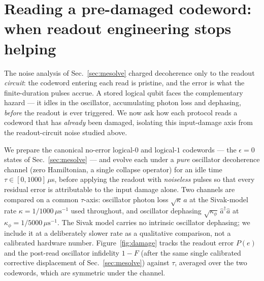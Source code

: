 
\section{Reading a pre-damaged codeword: when readout engineering stops helping}\label{sec:damage}

The noise analysis of Sec.~\ref{sec:mesolve} charged decoherence only to the readout
\emph{circuit}: the codeword entering each read is pristine, and the error is what the
finite-duration pulses accrue. A stored logical qubit faces the complementary hazard --- it
idles in the oscillator, accumulating photon loss and dephasing, \emph{before} the readout is
ever triggered. We now ask how each protocol reads a codeword that has \emph{already} been
damaged, isolating this input-damage axis from the readout-circuit noise studied above.

We prepare the canonical no-error logical-$0$ and logical-$1$ codewords --- the $\epsilon=0$
states of Sec.~\ref{sec:mesolve} --- and evolve each under a \emph{pure} oscillator
decoherence channel (zero Hamiltonian, a single collapse operator) for an idle time
$\tau\in[0,1000]\,\mu$s, before applying the readout with \emph{noiseless} pulses so that
every residual error is attributable to the input damage alone. Two channels are compared on a
common $\tau$-axis: oscillator photon loss $\sqrt{\kappa}\,\hat a$ at the Sivak-model rate
$\kappa=1/1000\,\mu\mathrm{s}^{-1}$ used throughout, and oscillator dephasing
$\sqrt{\kappa_\phi}\,\hat a^\dagger\hat a$ at $\kappa_\phi=1/5000\,\mu\mathrm{s}^{-1}$. The
Sivak model carries no intrinsic oscillator dephasing; we include it at a deliberately slower
rate as a qualitative comparison, not a calibrated hardware number. Figure~\ref{fig:damage}
tracks the readout error $P(e)$ and the post-read oscillator infidelity $1-F$ (after the same
single calibrated corrective displacement of Sec.~\ref{sec:mesolve}) against $\tau$, averaged
over the two codewords, which are symmetric under the channel.

